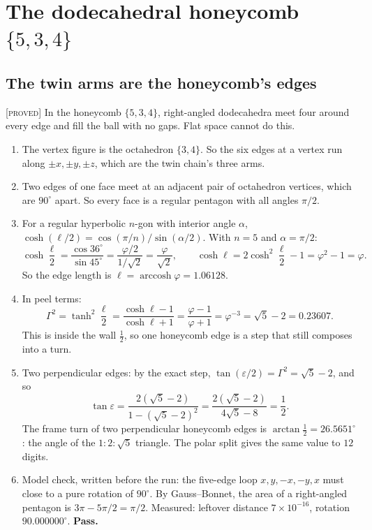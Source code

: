 \documentclass[11pt]{article}
\theoremstyle{definition}
\theoremstyle{remark}
\newcommand{\grade}[1]{\textsc{[#1]}}
\begin{document}
\section{The dodecahedral honeycomb $\{5,3,4\}$}\label{sec:honeycomb}

\subsection{The twin arms are the honeycomb's edges} \grade{proved}
In the honeycomb $\{5,3,4\}$, right-angled dodecahedra meet four around every edge and fill the ball with no gaps. Flat space cannot do this.
\begin{enumerate}
\item The vertex figure is the octahedron $\{3,4\}$. So the six edges at a vertex run along $\pm x,\pm y,\pm z$, which are the twin chain's three arms.
\item Two edges of one face meet at an adjacent pair of octahedron vertices, which are $90^\circ$ apart. So every face is a regular pentagon with all angles $\pi/2$.
\item For a regular hyperbolic $n$-gon with interior angle $\alpha$, $\cosh(\ell/2)=\cos(\pi/n)/\sin(\alpha/2)$. With $n=5$ and $\alpha=\pi/2$:
\[\cosh\frac{\ell}{2}=\frac{\cos36^\circ}{\sin45^\circ}=\frac{\varphi/2}{1/\sqrt2}=\frac{\varphi}{\sqrt2},\qquad
\cosh\ell=2\cosh^2\frac{\ell}{2}-1=\varphi^2-1=\varphi .\]
So the edge length is $\ell=\operatorname{arccosh}\varphi=1.06128$.
\item In peel terms:
\[\Gamma^2=\tanh^2\frac{\ell}{2}=\frac{\cosh\ell-1}{\cosh\ell+1}=\frac{\varphi-1}{\varphi+1}=\varphi^{-3}=\sqrt5-2=0.23607.\]
This is inside the wall $\tfrac12$, so one honeycomb edge is a step that still composes into a turn.
\item Two perpendicular edges: by the exact step, $\tan(\varepsilon/2)=\Gamma^2=\sqrt5-2$, and so
\[\tan\varepsilon=\frac{2(\sqrt5-2)}{1-(\sqrt5-2)^2}=\frac{2(\sqrt5-2)}{4\sqrt5-8}=\frac12 .\]
The frame turn of two perpendicular honeycomb edges is $\arctan\tfrac12=26.5651^\circ$: the angle of the $1:2:\sqrt5$ triangle. The polar split gives the same value to $12$ digits.
\item Model check, written before the run: the five-edge loop $x,y,-x,-y,x$ must close to a pure rotation of $90^\circ$. By Gauss--Bonnet, the area of a right-angled pentagon is $3\pi-5\pi/2=\pi/2$. Measured: leftover distance $7\times10^{-16}$, rotation $90.000000^\circ$. \textbf{Pass.}
\end{enumerate}
\end{document}
